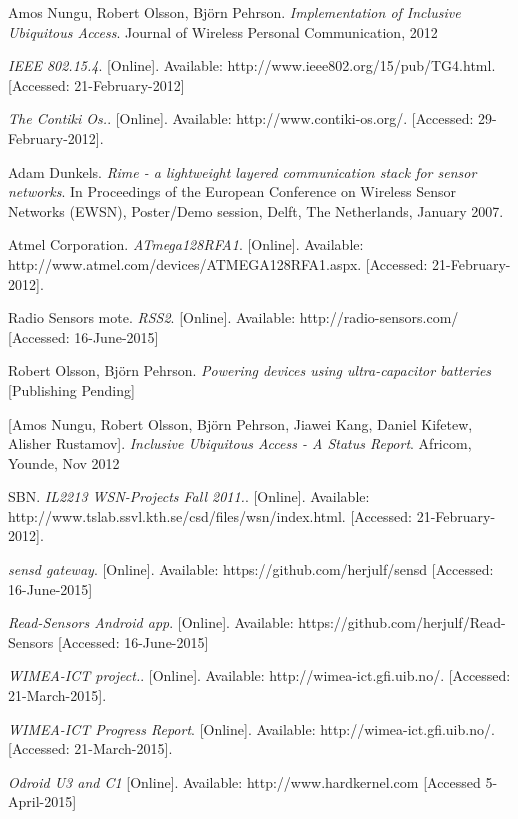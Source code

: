 \documentclass[conference, a4paper,10pt,twocolumn]{IEEEtran}
\begin{document}
\begin{thebibliography}{1}

 Amos Nungu, Robert Olsson, Bj\"{o}rn Pehrson. \emph{Implementation of Inclusive Ubiquitous Access}. 
Journal of Wireless Personal Communication, 2012

  \emph{IEEE 802.15.4}. 
[Online]. Available: http://www.ieee802.org/15/pub/TG4.html. [Accessed: 21-February-2012]

  \emph{The Contiki Os.}. 
[Online]. Available: http://www.contiki-os.org/. [Accessed: 29-February-2012].

 Adam Dunkels. \emph{Rime - a lightweight layered communication stack for sensor networks}.   In Proceedings of the European Conference on Wireless Sensor Networks (EWSN), Poster/Demo session, Delft, The Netherlands, January 2007.

 Atmel Corporation. \emph{ATmega128RFA1}. 
[Online]. Available: http://www.atmel.com/devices/ATMEGA128RFA1.aspx. [Accessed: 21-February-2012].

 Radio Sensors mote. \emph{RSS2}. 
[Online]. Available: http://radio-sensors.com/ [Accessed: 16-June-2015]

 Robert Olsson, Bj\"{o}rn Pehrson. \emph{Powering devices using ultra-capacitor batteries}
[Publishing Pending]

 [Amos Nungu, Robert Olsson, Bj\"{o}rn Pehrson, Jiawei Kang, Daniel Kifetew, Alisher Rustamov]. \emph{Inclusive Ubiquitous Access - A Status Report}. 
Africom, Younde, Nov 2012

 SBN. \emph{IL2213 WSN-Projects Fall 2011.}. 
[Online]. Available: http://www.tslab.ssvl.kth.se/csd/files/wsn/index.html. [Accessed: 21-February-2012].

  \emph{sensd gateway}. 
[Online]. Available: https://github.com/herjulf/sensd [Accessed: 16-June-2015]

  \emph{Read-Sensors Android app}. 
[Online]. Available: https://github.com/herjulf/Read-Sensors [Accessed: 16-June-2015]

  \emph{WIMEA-ICT project.}. 
[Online]. Available: http://wimea-ict.gfi.uib.no/. [Accessed: 21-March-2015].

  \emph{WIMEA-ICT Progress Report}. 
[Online]. Available: http://wimea-ict.gfi.uib.no/. [Accessed: 21-March-2015].

 \emph{Odroid U3 and C1}
[Online]. Available: http://www.hardkernel.com [Accessed 5-April-2015]
\end{thebibliography}
\end{document}
